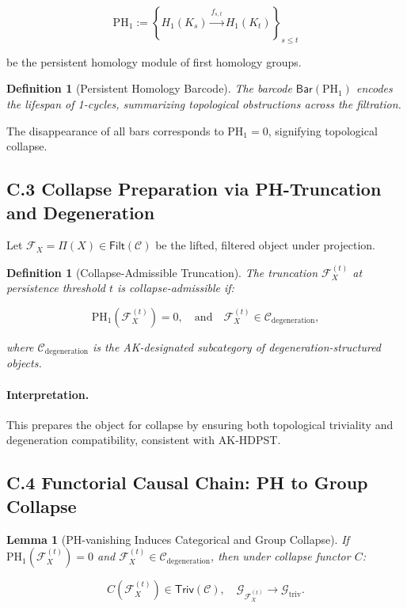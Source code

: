 \documentclass[11pt]{article}
\newtheorem{definition}[theorem]{Definition}
\newtheorem{lemma}[theorem]{Lemma}
\begin{document}
\[
\mathrm{PH}_1 := \left\{ H_1(K_s) \xrightarrow{f_{s,t}} H_1(K_t) \right\}_{s \leq t}
\]

be the persistent homology module of first homology groups.

\begin{definition}[Persistent Homology Barcode]
The barcode \( \mathsf{Bar}(\mathrm{PH}_1) \) encodes the lifespan of 1-cycles, summarizing topological obstructions across the filtration.
\end{definition}

The disappearance of all bars corresponds to \( \mathrm{PH}_1 = 0 \), signifying topological collapse.

\subsection*{C.3 Collapse Preparation via PH-Truncation and Degeneration}

Let \( \mathcal{F}_X = \Pi(X) \in \mathsf{Filt}(\mathcal{C}) \) be the lifted, filtered object under projection.

\begin{definition}[Collapse-Admissible Truncation]
The truncation \( \mathcal{F}_X^{(t)} \) at persistence threshold \( t \) is \emph{collapse-admissible} if:

\[
\mathrm{PH}_1(\mathcal{F}_X^{(t)}) = 0, \quad \text{and} \quad \mathcal{F}_X^{(t)} \in \mathcal{C}_{\mathrm{degeneration}},
\]

where \( \mathcal{C}_{\mathrm{degeneration}} \) is the AK-designated subcategory of degeneration-structured objects.
\end{definition}

\paragraph{Interpretation.}
This prepares the object for collapse by ensuring both topological triviality and degeneration compatibility, consistent with AK-HDPST.

\subsection*{C.4 Functorial Causal Chain: PH to Group Collapse}

\begin{lemma}[PH-vanishing Induces Categorical and Group Collapse]
If \( \mathrm{PH}_1(\mathcal{F}_X^{(t)}) = 0 \) and \( \mathcal{F}_X^{(t)} \in \mathcal{C}_{\mathrm{degeneration}} \), then under collapse functor \( C \):

\[
C(\mathcal{F}_X^{(t)}) \in \mathsf{Triv}(\mathcal{C}), \quad \mathcal{G}_{\mathcal{F}_X^{(t)}} \longrightarrow \mathcal{G}_{\mathrm{triv}}.
\]
\end{lemma}
\end{document}
